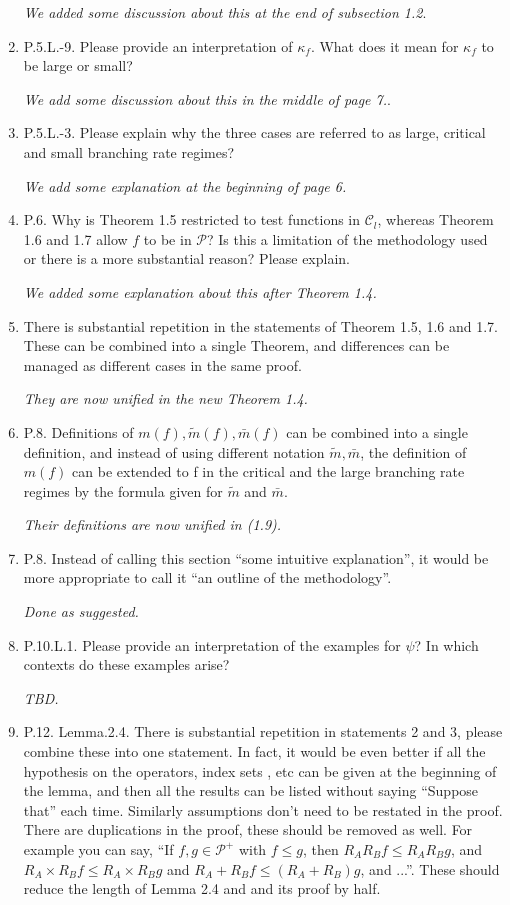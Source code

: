 \documentclass[12pt,a4paper]{amsart}
\numberwithin{equation}{section}
\theoremstyle{plain}
\theoremstyle{definition}
\begin{document}
\begin{enumerate}
  \emph{We added some discussion about this at the end of subsection 1.2}.
\item
  P.5.L.-9. 
  Please provide an interpretation of $\kappa_f$. 
  What does it mean for $\kappa_f$ to be large or small?
  
  \emph{We add some discussion about this in the middle of page 7.}.

\item
  P.5.L.-3. 
  Please explain why the three cases are referred to as large, critical and small branching rate regimes?
  
  \emph{We add some explanation at the beginning of page 6.}
\item
  P.6. 
  Why is Theorem 1.5 restricted to test functions in $\mathcal C_l$, whereas Theorem 1.6 and 1.7 allow $f$ to be in $\mathcal P$? 
  Is this a limitation of the methodology used or there is a more substantial reason? 
  Please explain.
  
  \emph{We added some explanation about this after Theorem 1.4.}
\item
  There is substantial repetition in the statements of Theorem 1.5, 1.6 and 1.7. 
  These can be combined into a single Theorem, and differences can be managed as different cases in the same proof.
  
  \emph{They are now unified in the new Theorem 1.4.}
\item
  P.8. 
  Definitions of $m(f ), \tilde m(f ), \bar m(f )$ can be combined into a single definition, and instead of using different notation $\tilde m, \bar m$, the definition of $m(f)$ can be extended to f in the critical and the large branching rate regimes by the formula given for $\tilde m$ and $\bar m$.
  
  \emph{Their definitions are now unified in (1.9).}
\item
  P.8.
  Instead of calling this section “some intuitive explanation”, it would be more appropriate to call it “an outline of the methodology”.
  
  \emph{Done as suggested.}
\item
  P.10.L.1.
  Please provide an interpretation of the examples for $\psi$?
  In which contexts do these examples arise?
  
  \emph{TBD.}
\item
  P.12. Lemma.2.4. 
  There is substantial repetition in statements 2 and 3, please combine these into one statement. 
  In fact, it would be even better if all the hypothesis on the operators, index sets , etc can be given at the beginning of the lemma, and then all the results can be listed without saying “Suppose that” each time. 
  Similarly assumptions don’t need to be restated in the proof. 
  There are duplications in the proof, these should be removed as well. 
  For example you can say, “If $f,g \in \mathcal P^+$ with $f \leq g$, then $R_AR_Bf \leq R_AR_Bg$, and $R_A \times R_B f \leq R_A \times R_B g$ and $R_A +R_B f \leq (R_A +R_B)g$, and ...”. 
  These should reduce the length of Lemma 2.4 and and its proof by half.
  

\end{enumerate}
\end{document}
